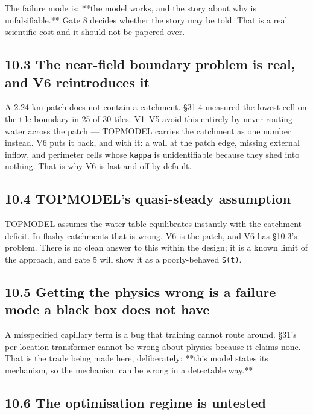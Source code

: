 \documentclass[10pt,a4paper]{article}
\begin{document}
The failure mode is: **the model works, and the story about why is
unfalsifiable.** Gate 8 decides whether the story may be told. That is a real
scientific cost and it should not be papered over.

\subsection*{10.3 The near-field boundary problem is real, and V6 reintroduces it}

A 2.24 km patch does not contain a catchment. §31.4 measured the lowest cell on
the tile boundary in 25 of 30 tiles. V1–V5 avoid this entirely by never routing
water across the patch — TOPMODEL carries the catchment as one number instead.
V6 puts it back, and with it: a wall at the patch edge, missing external inflow,
and perimeter cells whose \texttt{kappa} is unidentifiable because they shed into
nothing. That is why V6 is last and off by default.

\subsection*{10.4 TOPMODEL's quasi-steady assumption}

TOPMODEL assumes the water table equilibrates instantly with the catchment
deficit. In flashy catchments that is wrong. V6 is the patch, and V6 has §10.3's
problem. There is no clean answer to this within the design; it is a known
limit of the approach, and gate 5 will show it as a poorly-behaved \texttt{S(t)}.

\subsection*{10.5 Getting the physics wrong is a failure mode a black box does not have}

A misspecified capillary term is a bug that training cannot route around. §31's
per-location transformer cannot be wrong about physics because it claims none.
That is the trade being made here, deliberately: **this model states its
mechanism, so the mechanism can be wrong in a detectable way.**

\subsection*{10.6 The optimisation regime is untested}
\end{document}
